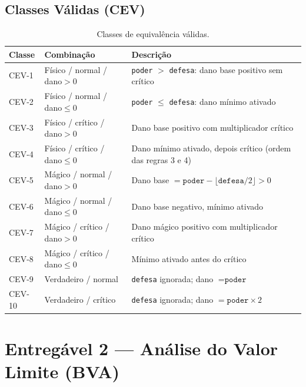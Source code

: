 \documentclass[conference, onecolumn]{IEEEtran}
\begin{document}
\subsection{Classes Válidas (CEV)}

\begin{table}[H]
\centering
\caption{Classes de equivalência válidas.}
\begin{tabular}{@{}llp{7cm}@{}}
\toprule
\textbf{Classe} & \textbf{Combinação} & \textbf{Descrição} \\
\midrule
CEV-1  & Físico / normal / dano$>$0        & \texttt{poder} $>$ \texttt{defesa}: dano base positivo sem crítico \\
CEV-2  & Físico / normal / dano$\leq$0     & \texttt{poder} $\leq$ \texttt{defesa}: dano mínimo ativado \\
CEV-3  & Físico / crítico / dano$>$0       & Dano base positivo com multiplicador crítico \\
CEV-4  & Físico / crítico / dano$\leq$0    & Dano mínimo ativado, depois crítico (ordem das regras 3 e 4) \\
CEV-5  & Mágico / normal / dano$>$0        & Dano base $= \texttt{poder} - \lfloor\texttt{defesa}/2\rfloor > 0$ \\
CEV-6  & Mágico / normal / dano$\leq$0     & Dano base negativo, mínimo ativado \\
CEV-7  & Mágico / crítico / dano$>$0       & Dano mágico positivo com multiplicador crítico \\
CEV-8  & Mágico / crítico / dano$\leq$0    & Mínimo ativado antes do crítico \\
CEV-9  & Verdadeiro / normal               & \texttt{defesa} ignorada; dano $= \texttt{poder}$ \\
CEV-10 & Verdadeiro / crítico              & \texttt{defesa} ignorada; dano $= \texttt{poder} \times 2$ \\
\bottomrule
\end{tabular}
\end{table}

\section{Entregável 2 — Análise do Valor Limite (BVA)}
\end{document}
